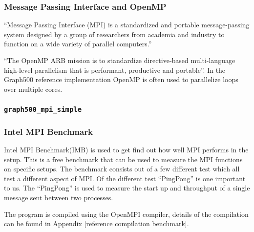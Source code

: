 \subsubsection{Message Passing Interface and OpenMP}
\label{mpiopenmp}
``Message Passing Interface (MPI) is a standardized and portable message-passing system designed by a group of researchers from academia and industry to function on a wide variety of parallel computers.\cite{mpi}''


``The OpenMP ARB mission is to standardize directive-based multi-language high-level parallelism that is performant, productive and portable''\cite{openmp}. In the Graph500 reference implementation OpenMP is often used to parallelize loops over multiple cores. 

\subsubsection{\texttt{graph500\_mpi\_simple}}

\subsubsection{Intel MPI Benchmark}
\label{tools-imb}
Intel MPI Benchmark(IMB) is used to get find out how well MPI performs in the setup. This is a free benchmark that can be used to measure the MPI functions on specific setups. The benchmark consists out of a few different test which all test a different aspect of MPI. Of the different test ``PingPong'' is one important to us. The ``PingPong'' is used to measure the start up and throughput of a single message sent between two processes\cite{img-userguide}.

 The program is compiled using the OpenMPI compiler, details of the compilation can be found in Appendix [reference compilation benchmark].

